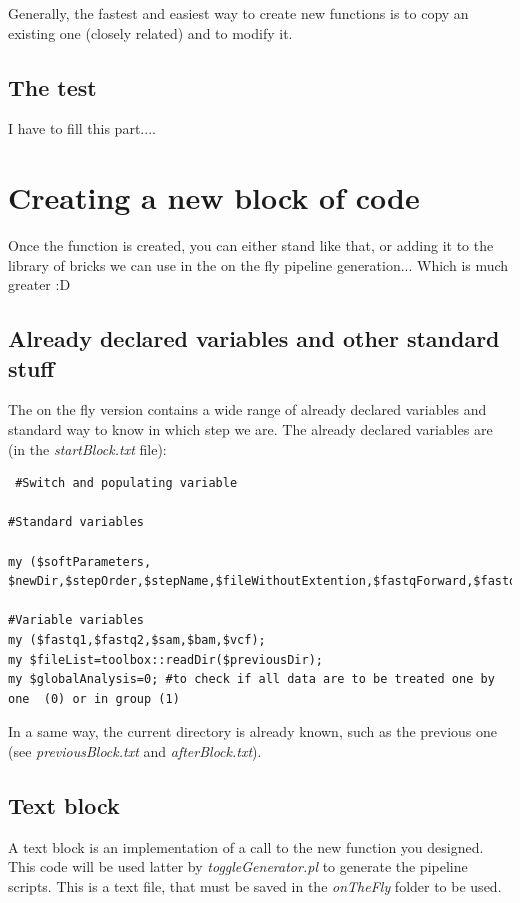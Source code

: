 \documentclass[a4paper,10pt]{report}
\begin{document}
Generally, the fastest and easiest way to create new functions is to copy an existing one (closely related) and to modify it.


\section{The test}

I have to fill this part....


\chapter{Creating a new block of code}
Once the function is created, you can either stand like that, or adding it to the library of bricks we can use in the on the fly pipeline generation... Which is much greater :D

\section{Already declared variables and other standard stuff}

The on the fly version contains a wide range of already declared variables and standard way to know in which step we are. The already declared variables are (in the \emph{startBlock.txt} file):
\begin{lstlisting}
 #Switch and populating variable

#Standard variables

my ($softParameters, $newDir,$stepOrder,$stepName,$fileWithoutExtention,$fastqForward,$fastqReverse,$samFile,$extension,$samFileOut,$shortDirName,$stepF1,$vcfCalled,$vcfOut,$listOfBam,$bamFile,$bamFileOut,$cleanerCommand,$intervalsFile,$replacementCommand);

#Variable variables
my ($fastq1,$fastq2,$sam,$bam,$vcf);
my $fileList=toolbox::readDir($previousDir);
my $globalAnalysis=0; #to check if all data are to be treated one by one  (0) or in group (1)

\end{lstlisting}

In a same way, the current directory is already known, such as the previous one (see \emph{previousBlock.txt} and \emph{afterBlock.txt}).

\section{Text block}

A text block is an implementation of a call to the new function you designed. This code will be used latter by \textit{toggleGenerator.pl} to generate the pipeline scripts. This is a text file, that must be saved in the \emph{onTheFly} folder to be used.
\end{document}
